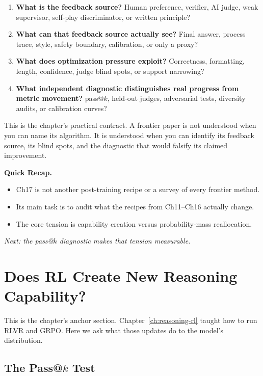 \begin{enumerate}[nosep]
  \item \textbf{What is the feedback source?} Human preference, verifier, AI judge, weak supervisor, self-play discriminator, or written principle?
  \item \textbf{What can that feedback source actually see?} Final answer, process trace, style, safety boundary, calibration, or only a proxy?
  \item \textbf{What does optimization pressure exploit?} Correctness, formatting, length, confidence, judge blind spots, or support narrowing?
  \item \textbf{What independent diagnostic distinguishes real progress from metric movement?} pass@$k$, held-out judges, adversarial tests, diversity audits, or calibration curves?
\end{enumerate}

This is the chapter's practical contract. A frontier paper is not understood when you can name its algorithm. It is understood when you can identify its feedback source, its blind spots, and the diagnostic that would falsify its claimed improvement.

\begin{quickrecap}
\textbf{Quick Recap.}
\begin{itemize}[nosep,leftmargin=1.5em]
  \item Ch17 is not another post-training recipe or a survey of every frontier method.
  \item Its main task is to audit what the recipes from Ch11--Ch16 actually change.
  \item The core tension is capability creation versus probability-mass reallocation.
\end{itemize}
\textit{Next: the pass@$k$ diagnostic makes that tension measurable.}
\end{quickrecap}


\section{Does RL Create New Reasoning Capability?}
\label{sec:rl-create-capability}

This is the chapter's anchor section. Chapter~\ref{ch:reasoning-rl} taught how to run RLVR and GRPO. Here we ask what those updates do to the model's distribution.

\subsection[The Pass@k Test]{The Pass@$k$ Test}

